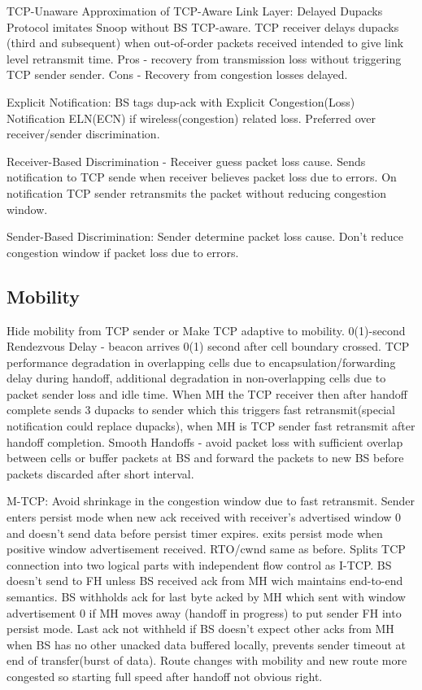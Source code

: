 \documentclass[8pt]{extarticle}
\begin{document}
\begin{multicols}{2}
TCP-Unaware Approximation of TCP-Aware Link Layer: Delayed Dupacks Protocol imitates Snoop without BS TCP-aware. TCP receiver delays dupacks (third and subsequent) when out-of-order packets received intended to give link level retransmit time. Pros - recovery from  transmission loss without triggering TCP sender sender. Cons - Recovery from congestion losses delayed.

Explicit Notification: BS tags dup-ack with Explicit Congestion(Loss) Notification ELN(ECN) if wireless(congestion) related loss.  Preferred over receiver/sender discrimination. 

Receiver-Based Discrimination - Receiver guess packet loss cause. Sends notification to TCP sende when receiver believes packet loss due to errors. On notification TCP sender retransmits the packet without reducing congestion window.

Sender-Based Discrimination: Sender determine packet loss cause. Don't reduce congestion window if packet loss due to errors.

\subsection{Mobility}

Hide mobility from TCP sender or Make TCP adaptive to mobility. 0(1)-second Rendezvous Delay - beacon arrives 0(1) second after cell boundary crossed. TCP performance degradation in overlapping cells due to encapsulation/forwarding delay during handoff, additional degradation in non-overlapping cells due to packet sender loss and idle time. When MH the TCP receiver then after handoff complete sends 3 dupacks to sender which this triggers fast retransmit(special notification could replace dupacks), when MH is TCP sender fast retransmit after handoff completion. Smooth Handoffs - avoid packet loss with sufficient overlap between cells or buffer packets at BS and forward the packets to new BS before packets discarded after short interval.

M-TCP: Avoid shrinkage in the congestion window due to fast retransmit. Sender enters persist mode when new ack received with receiver’s advertised window 0 and doesn't send data before persist timer expires. exits persist mode when positive window advertisement received. RTO/cwnd same as before. Splits TCP connection into two logical parts with independent flow control as I-TCP. BS doesn't send to FH unless BS received ack from MH wich maintains end-to-end semantics. BS withholds ack for last byte acked by MH which sent with window advertisement 0 if MH moves away (handoff in progress) to put sender FH into persist mode. Last ack not withheld if BS doesn't expect other acks from MH when BS has no other unacked data buffered locally, prevents sender timeout at end of transfer(burst of data). Route changes with mobility and new route more congested so starting full speed after handoff not obvious right.


\end{multicols}
\end{document}
